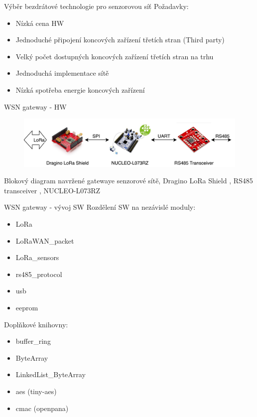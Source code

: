 \documentclass{beamer}
\begin{document}
\begin{frame}{Výběr bezdrátové technologie pro senzorovou síť}
	Požadavky:
	\begin{itemize}
		\item Nízká cena HW
		\item Jednoduché připojení koncových zařízení třetích stran (Third party)
		\item Velký počet dostupných koncových zařízení třetích stran na trhu 
		\item Jednoduchá implementace sítě
		\item Nízká spotřeba energie koncových zařízení
	\end{itemize}

\end{frame}


\begin{frame} {WSN gateway - HW}
	\begin{figure}[!h]
		\centering
		\includegraphics[width=1\textwidth]{LoRaWAN_gw_RS485_blockDiagram_3}
		\label{fig:gatewayBlockDiagram}
	\end{figure}

	Blokový diagram navržené gatewaye senzorové sítě, Dragino LoRa Shield \cite{draginoWiki}, RS485 transceiver \cite{rs485tr}, NUCLEO-L073RZ \cite{nucleo-l073RZ_ST}

\end{frame}

\begin{frame} {WSN gateway - vývoj SW}
		Rozdělení SW na nezávislé moduly:
		\begin{itemize}
			\item LoRa
			\item LoRaWAN\_packet
			\item LoRa\_sensors
			\item rs485\_protocol
			\item usb
			\item eeprom
		\end{itemize}

		Doplňkové knihovny:
		\begin{itemize}
			\item buffer\_ring
			\item ByteArray
			\item LinkedList\_ByteArray
			\item aes (tiny-aes) \cite{lib_tiny-AES128-C} 
			\item cmac (openpana) \cite{lib_openpana}
		\end{itemize}
\end{frame}
\end{document}
